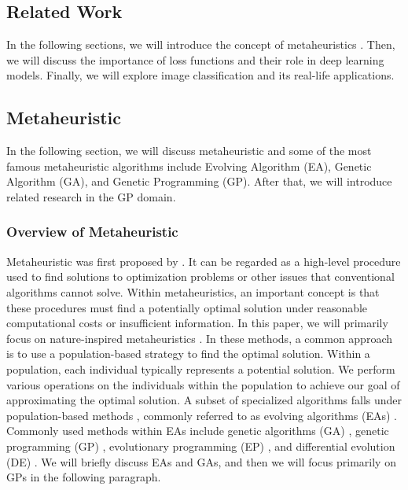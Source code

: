 \begin{ZhChapter}
    \chapter{Related Work}
    In the following sections, we will introduce the concept of metaheuristics \cite{yang2010nature,yang2011metaheuristic} . Then, we will discuss the importance of loss functions and their role in deep learning \cite{deepLearning} models. Finally, we will explore image classification \cite{rawat2017deep} and its real-life applications.

    \section{Metaheuristic}
    In the following section, we will discuss metaheuristic and some of the most famous metaheuristic algorithms include Evolving Algorithm (EA), Genetic Algorithm (GA), and Genetic Programming (GP). After that, we will introduce related research in the GP domain.
    \subsection{Overview of Metaheuristic}
    Metaheuristic \cite{glover1986future} was first proposed by \citeauthor{glover1986future}. It can be regarded as a high-level procedure used to find solutions to optimization problems or other issues that conventional algorithms cannot solve. Within metaheuristics, an important concept is that these procedures must find a potentially optimal solution under reasonable computational costs or insufficient information. In this paper, we will primarily focus on nature-inspired metaheuristics \cite{yang2010nature}. In these methods, a common approach is to use a population-based strategy to find the optimal solution. Within a population, each individual typically represents a potential solution. We perform various operations on the individuals within the population to achieve our goal of approximating the optimal solution. A subset of specialized algorithms falls under population-based methods \cite{enwiki:1255593755}, commonly referred to as evolving algorithms (EAs) \cite{muhlenbein1988evolution}. Commonly used methods within EAs include genetic algorithms (GA) \cite{kumar2010genetic}, genetic programming (GP) \cite{geneticProgramming} , evolutionary programming (EP) \cite{yao1999evolutionary}, and differential evolution (DE) \cite{das2010differential}. We will briefly discuss EAs and GAs, and then we will focus primarily on GPs in the following paragraph.


\end{ZhChapter}
